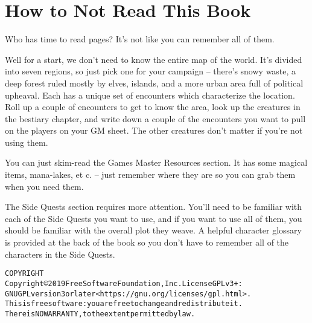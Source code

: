 \section*{How to Not Read This Book}

\begin{multicols}{2}

\noindent Who has time to read \pageref{lastpage} pages?  It's not like you can remember all of them.

Well for a start, we don't need to know the entire map of the world.
It's divided into seven regions, so just pick one for your campaign -- there's snowy waste, a deep forest ruled mostly by elves, islands, and a more urban area full of political upheaval.
Each has a unique set of encounters which characterize the location.
Roll up a couple of encounters to get to know the area, look up the creatures in the bestiary chapter, and write down a couple of the encounters you want to pull on the players on your GM sheet.
The other creatures don't matter if you're not using them.

You can just skim-read the Games Master Resources section.
It has some magical items, mana-lakes, et c. -- just remember where they are so you can grab them when you need them.

The Side Quests section requires more attention.
You'll need to be familiar with each of the Side Quests you want to use, and if you want to use all of them, you should be familiar with the overall plot they weave.
A helpful character glossary is provided at the back of the book so you don't have to remember all of the characters in the Side Quests.

\end{multicols}

\begin{alltt}
COPYRIGHT
       Copyright \copyright 2019 Free Software Foundation, Inc.  License GPLv3+:
  GNU GPL version 3 or later <https://gnu.org/licenses/gpl.html>.
       This is free software: you are free to change and redistribute it.
  There is NO WARRANTY, to the extent permitted by law.

\end{alltt}
